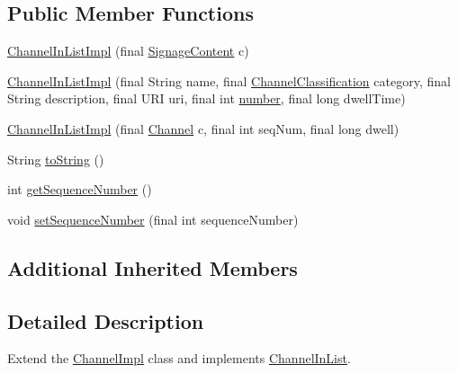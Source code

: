 \subsection*{Public Member Functions}
\begin{DoxyCompactItemize}
\item 
\hyperlink{classgov_1_1fnal_1_1ppd_1_1dd_1_1channel_1_1ChannelInListImpl_a305c35a433a166f8f3d4da96c89971b7}{Channel\-In\-List\-Impl} (final \hyperlink{interfacegov_1_1fnal_1_1ppd_1_1dd_1_1signage_1_1SignageContent}{Signage\-Content} c)
\item 
\hyperlink{classgov_1_1fnal_1_1ppd_1_1dd_1_1channel_1_1ChannelInListImpl_a7da4424fa40cba92ec8534a0925c4065}{Channel\-In\-List\-Impl} (final String name, final \hyperlink{classgov_1_1fnal_1_1ppd_1_1dd_1_1changer_1_1ChannelClassification}{Channel\-Classification} category, final String description, final U\-R\-I uri, final int \hyperlink{classgov_1_1fnal_1_1ppd_1_1dd_1_1channel_1_1ChannelImpl_ae4de39eb5e2f7c434f3b71f054ae9735}{number}, final long dwell\-Time)
\item 
\hyperlink{classgov_1_1fnal_1_1ppd_1_1dd_1_1channel_1_1ChannelInListImpl_a8e42fcff08b52add9a348c9da75acef6}{Channel\-In\-List\-Impl} (final \hyperlink{interfacegov_1_1fnal_1_1ppd_1_1dd_1_1signage_1_1Channel}{Channel} c, final int seq\-Num, final long dwell)
\item 
String \hyperlink{classgov_1_1fnal_1_1ppd_1_1dd_1_1channel_1_1ChannelInListImpl_ae7951128c28acebbdfb2c5ce5ecc9fb2}{to\-String} ()
\item 
int \hyperlink{classgov_1_1fnal_1_1ppd_1_1dd_1_1channel_1_1ChannelInListImpl_a5e73b434e0de404051c085308bba70b9}{get\-Sequence\-Number} ()
\item 
void \hyperlink{classgov_1_1fnal_1_1ppd_1_1dd_1_1channel_1_1ChannelInListImpl_a3d7875d359431d5e2dc13b60db55cf72}{set\-Sequence\-Number} (final int sequence\-Number)
\end{DoxyCompactItemize}
\subsection*{Additional Inherited Members}


\subsection{Detailed Description}
Extend the \hyperlink{classgov_1_1fnal_1_1ppd_1_1dd_1_1channel_1_1ChannelImpl}{Channel\-Impl} class and implements \hyperlink{interfacegov_1_1fnal_1_1ppd_1_1dd_1_1channel_1_1ChannelInList}{Channel\-In\-List}.

